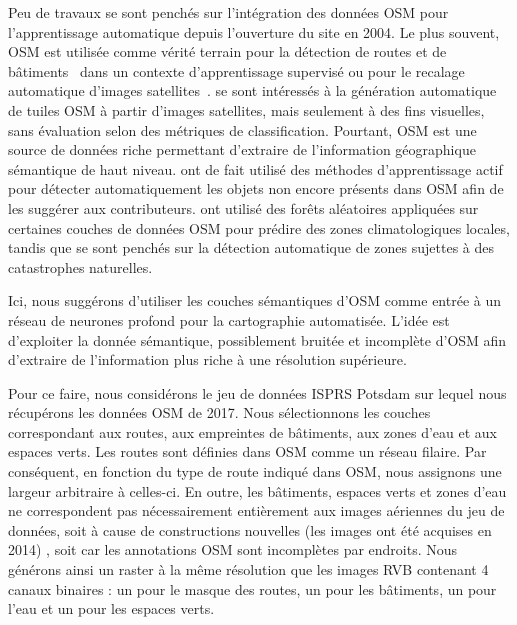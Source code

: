 Peu de travaux se sont penchés sur l'intégration des données \gls{OSM} pour l'apprentissage automatique depuis l'ouverture du site en 2004. Le plus souvent, \gls{OSM} est utilisée comme vérité terrain pour la détection de routes et de bâtiments~\cite{mnih_machine_2013,maggiori_learning_2017} dans un contexte d'apprentissage supervisé ou pour le recalage automatique d'images satellites~\cite{vakalopoulou_simultaneous_2016}. \citet{isola_image--image_2016} se sont intéressés à la génération automatique de tuiles \gls{OSM} à partir d'images satellites, mais seulement à des fins visuelles, sans évaluation selon des métriques de classification. Pourtant, \gls{OSM} est une source de données riche permettant d'extraire de l'information géographique sémantique de haut niveau. \citet{chen_deepvgi_2017} ont de fait utilisé des méthodes d'apprentissage actif pour détecter automatiquement les objets non encore présents dans \gls{OSM} afin de les suggérer aux contributeurs. \citet{danylo_contributing_2016} ont utilisé des forêts aléatoires appliquées sur certaines couches de données \gls{OSM} pour prédire des zones climatologiques locales, tandis que \citet{geis_joint_2017} se sont penchés sur la détection automatique de zones sujettes à des catastrophes naturelles.

Ici, nous suggérons d'utiliser les couches sémantiques d'\gls{OSM} comme entrée à un réseau de neurones profond pour la cartographie automatisée. L'idée est d'exploiter la donnée sémantique, possiblement bruitée et incomplète d'\gls{OSM} afin d'extraire de l'information plus riche à une résolution supérieure.

Pour ce faire, nous considérons le jeu de données ISPRS Potsdam sur lequel nous récupérons les données \gls{OSM} de 2017. Nous sélectionnons les couches correspondant aux routes, aux empreintes de bâtiments, aux zones d'eau et aux espaces verts. Les routes sont définies dans \gls{OSM} comme un réseau filaire. Par conséquent, en fonction du type de route indiqué dans \gls{OSM}, nous assignons une largeur arbitraire à celles-ci. En outre, les bâtiments, espaces verts et zones d'eau ne correspondent pas nécessairement entièrement aux images aériennes du jeu de données, soit à cause de constructions nouvelles (les images ont été acquises en 2014) , soit car les annotations \gls{OSM} sont incomplètes par endroits. Nous générons ainsi un raster à la même résolution que les images \gls{RVB} contenant 4 canaux binaires : un pour le masque des routes, un pour les bâtiments, un pour l'eau et un pour les espaces verts.

